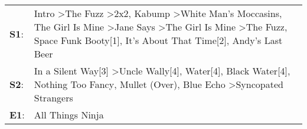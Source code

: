 \begin{supertabular}{p{0.03\textwidth}p{0.92\textwidth}}
 \textbf{S1}:  &  Intro\textsuperscript{} \textgreater \enspace The Fuzz\textsuperscript{} \textgreater \enspace 2x2\textsuperscript{}, \enspace Kabump\textsuperscript{} \textgreater \enspace White Man's Moccasins\textsuperscript{}, \enspace The Girl Is Mine\textsuperscript{} \textgreater \enspace Jane Says\textsuperscript{} \textgreater \enspace The Girl Is Mine\textsuperscript{} \textgreater \enspace The Fuzz\textsuperscript{}, \enspace Space Funk Booty[1]\textsuperscript{}, \enspace It's About That Time[2]\textsuperscript{}, \enspace Andy's Last Beer\textsuperscript{}  \enspace  \\
 \textbf{S2}:  &                                                                                                                                                                                                           In a Silent Way[3]\textsuperscript{} \textgreater \enspace Uncle Wally[4]\textsuperscript{}, \enspace Water[4]\textsuperscript{}, \enspace Black Water[4]\textsuperscript{}, \enspace Nothing Too Fancy\textsuperscript{}, \enspace Mullet (Over)\textsuperscript{}, \enspace Blue Echo\textsuperscript{} \textgreater \enspace Syncopated Strangers\textsuperscript{}  \enspace  \\
 \textbf{E1}:  &                                                                                                                                                                                                                                                                                                                                                                                                                                                                                                                                               All Things Ninja\textsuperscript{}  \enspace  \\
\end{supertabular}
